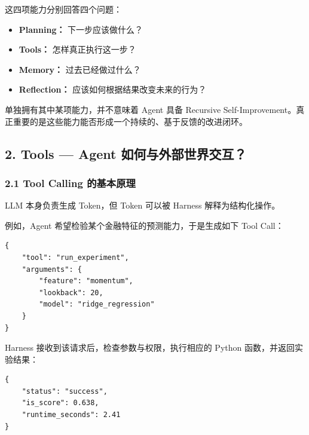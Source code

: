 
这四项能力分别回答四个问题：

\begin{itemize}
\tightlist
\item
  \textbf{Planning：} 下一步应该做什么？
\item
  \textbf{Tools：} 怎样真正执行这一步？
\item
  \textbf{Memory：} 过去已经做过什么？
\item
  \textbf{Reflection：} 应该如何根据结果改变未来的行为？
\end{itemize}

单独拥有其中某项能力，并不意味着 Agent 具备 Recursive Self-Improvement。真正重要的是这些能力能否形成一个持续的、基于反馈的改进闭环。

\hypertarget{part-3-34-0001-tools-agent-ux5982ux4f55ux4e0eux5916ux90e8ux4e16ux754cux4ea4ux4e92}{%
\subsection{2. Tools --- Agent 如何与外部世界交互？}\label{part-3-34-0001-tools-agent-ux5982ux4f55ux4e0eux5916ux90e8ux4e16ux754cux4ea4ux4e92}}

\hypertarget{part-3-34-0001-tool-calling-ux7684ux57faux672cux539fux7406}{%
\subsubsection{2.1 Tool Calling 的基本原理}\label{part-3-34-0001-tool-calling-ux7684ux57faux672cux539fux7406}}

LLM 本身负责生成 Token，但 Token 可以被 Harness 解释为结构化操作。

例如，Agent 希望检验某个金融特征的预测能力，于是生成如下 Tool Call：

\begin{verbatim}
{
    "tool": "run_experiment",
    "arguments": {
        "feature": "momentum",
        "lookback": 20,
        "model": "ridge_regression"
    }
}
\end{verbatim}

Harness 接收到该请求后，检查参数与权限，执行相应的 Python 函数，并返回实验结果：

\begin{verbatim}
{
    "status": "success",
    "is_score": 0.638,
    "runtime_seconds": 2.41
}
\end{verbatim}

